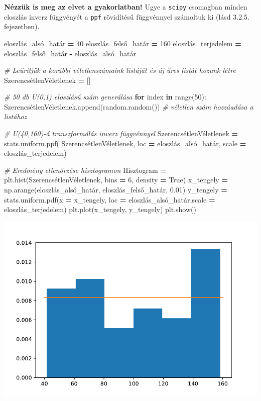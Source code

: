 \documentclass[
]{book}
\newenvironment{Shaded}{\begin{snugshade}}{\end{snugshade}}
\newcommand{\BuiltInTok}[1]{#1}
\newcommand{\CommentTok}[1]{\textcolor[rgb]{0.56,0.35,0.01}{\textit{#1}}}
\newcommand{\ControlFlowTok}[1]{\textcolor[rgb]{0.13,0.29,0.53}{\textbf{#1}}}
\newcommand{\DecValTok}[1]{\textcolor[rgb]{0.00,0.00,0.81}{#1}}
\newcommand{\FloatTok}[1]{\textcolor[rgb]{0.00,0.00,0.81}{#1}}
\newcommand{\KeywordTok}[1]{\textcolor[rgb]{0.13,0.29,0.53}{\textbf{#1}}}
\newcommand{\NormalTok}[1]{#1}
\newcommand{\OperatorTok}[1]{\textcolor[rgb]{0.81,0.36,0.00}{\textbf{#1}}}
\newcommand{\VariableTok}[1]{\textcolor[rgb]{0.00,0.00,0.00}{#1}}
\begin{document}
\textbf{Nézzük is meg az elvet a gyakorlatban!} Ugye a \texttt{scipy} csomagban minden eloszlás inverz függvényét a \texttt{ppf} rövidítésű függvénnyel számoltuk ki (lásd 3.2.5. fejezetben).

\begin{Shaded}
\begin{Highlighting}[]
\NormalTok{eloszlás\_alsó\_határ }\OperatorTok{=} \DecValTok{40}
\NormalTok{eloszlás\_felső\_határ }\OperatorTok{=} \DecValTok{160}
\NormalTok{eloszlás\_terjedelem }\OperatorTok{=}\NormalTok{ eloszlás\_felső\_határ }\OperatorTok{{-}}\NormalTok{ eloszlás\_alsó\_határ}

\CommentTok{\# Leürítjük a korábbi véletlenszámaink listáját és új üres listát hozunk létre}
\NormalTok{SzerencsétlenVéletlenek }\OperatorTok{=}\NormalTok{ []}

\CommentTok{\# 50 db U(0,1) eloszlású szám generálása}
\ControlFlowTok{for}\NormalTok{ index }\KeywordTok{in} \BuiltInTok{range}\NormalTok{(}\DecValTok{50}\NormalTok{):}
\NormalTok{  SzerencsétlenVéletlenek.append(random.random()) }\CommentTok{\# véletlen szám hozzáadása a listához}

\CommentTok{\# U(40,160){-}á transzformálás inverz függvénnyel}
\NormalTok{SzerencsétlenVéletlenek }\OperatorTok{=}\NormalTok{ stats.uniform.ppf(}
\NormalTok{  SzerencsétlenVéletlenek,}
\NormalTok{  loc }\OperatorTok{=}\NormalTok{ eloszlás\_alsó\_határ,}
\NormalTok{  scale }\OperatorTok{=}\NormalTok{ eloszlás\_terjedelem)}

\CommentTok{\# Eredmény ellenőrzése hisztogramon}
\NormalTok{Hisztogram }\OperatorTok{=}\NormalTok{ plt.hist(SzerencsétlenVéletlenek, bins }\OperatorTok{=} \DecValTok{6}\NormalTok{, density }\OperatorTok{=} \VariableTok{True}\NormalTok{)}
\NormalTok{x\_tengely }\OperatorTok{=}\NormalTok{ np.arange(eloszlás\_alsó\_határ, eloszlás\_felső\_határ, }\FloatTok{0.01}\NormalTok{)}
\NormalTok{y\_tengely }\OperatorTok{=}\NormalTok{ stats.uniform.pdf(x }\OperatorTok{=}\NormalTok{ x\_tengely, loc }\OperatorTok{=}\NormalTok{ eloszlás\_alsó\_határ,scale }\OperatorTok{=}\NormalTok{ eloszlás\_terjedelem)}
\NormalTok{plt.plot(x\_tengely, y\_tengely)}
\NormalTok{plt.show()}
\end{Highlighting}
\end{Shaded}

\includegraphics{_main_files/figure-latex/unnamed-chunk-207-7.pdf}
\end{document}

